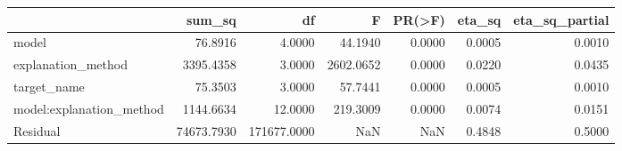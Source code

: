 \begin{tabular}{lrrrrrr}
\toprule
 & sum_sq & df & F & PR(>F) & eta_sq & eta_sq_partial \\
\midrule
model & 76.8916 & 4.0000 & 44.1940 & 0.0000 & 0.0005 & 0.0010 \\
explanation_method & 3395.4358 & 3.0000 & 2602.0652 & 0.0000 & 0.0220 & 0.0435 \\
target_name & 75.3503 & 3.0000 & 57.7441 & 0.0000 & 0.0005 & 0.0010 \\
model:explanation_method & 1144.6634 & 12.0000 & 219.3009 & 0.0000 & 0.0074 & 0.0151 \\
Residual & 74673.7930 & 171677.0000 & NaN & NaN & 0.4848 & 0.5000 \\
\bottomrule
\end{tabular}
